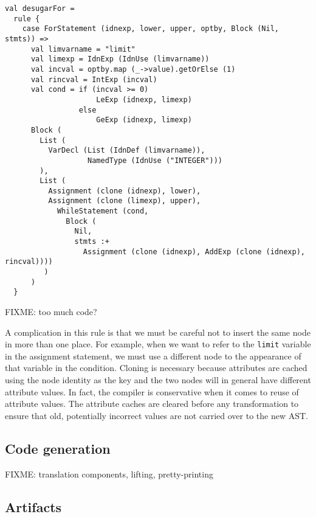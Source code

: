 \begin{verbatim}
val desugarFor =
  rule {
    case ForStatement (idnexp, lower, upper, optby, Block (Nil, stmts)) =>
      val limvarname = "limit"
      val limexp = IdnExp (IdnUse (limvarname))
      val incval = optby.map (_->value).getOrElse (1)
      val rincval = IntExp (incval)
      val cond = if (incval >= 0)
                     LeExp (idnexp, limexp)
                 else
                     GeExp (idnexp, limexp)
      Block (
        List (
          VarDecl (List (IdnDef (limvarname)),
                   NamedType (IdnUse ("INTEGER")))
        ),
        List (
          Assignment (clone (idnexp), lower),
          Assignment (clone (limexp), upper),
            WhileStatement (cond,
              Block (
                Nil,
                stmts :+
                  Assignment (clone (idnexp), AddExp (clone (idnexp), rincval))))
         )
      )
  }
\end{verbatim}

FIXME: too much code?

A complication in this rule is that we must be careful not to insert the same node in more than one place.
For example, when we want to refer to the \verb|limit| variable in the assignment statement, we must use a different node to the appearance of that variable in the condition.
Cloning is necessary because attributes are cached using the node identity as the key and the two nodes will in general have different attribute values.
In fact, the compiler is conservative when it comes to reuse of attribute values.
The attribute caches are cleared before any transformation to ensure that old, potentially incorrect values are not carried over to the new AST.

\subsection{Code generation}
\label{sec:kiama-codegen}

FIXME: translation components, lifting, pretty-printing


\subsection{Artifacts}
\label{sec:kiama-artifacts}

